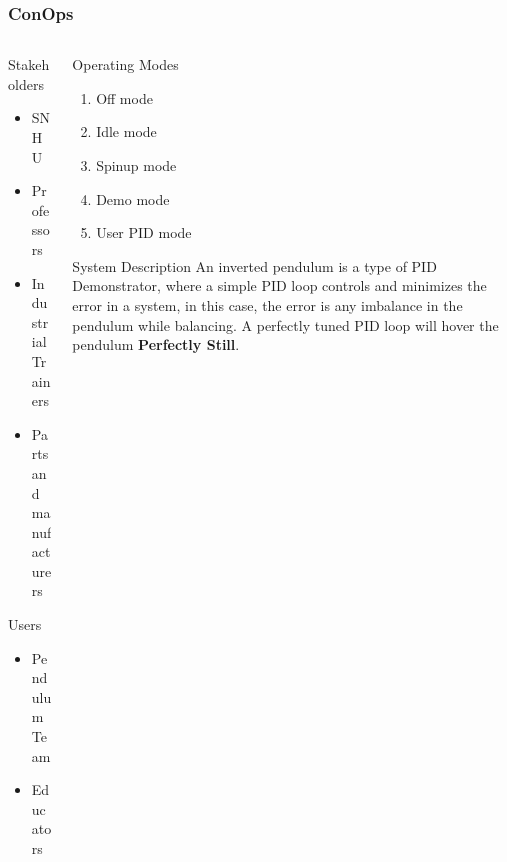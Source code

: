 \documentclass[aspectratio=169]{beamer}
\begin{document}
\begin{frame}
    \frametitle{ConOps}

    \begin{columns}

    \begin{column}{0.34\textwidth}
        Stakeholders
        \begin{itemize}
         \item SNHU
         \item Professors
         \item Industrial Trainers
         \item Parts and manufacturers
        \end{itemize}

        Users
        \begin{itemize}
         \item Pendulum Team
         \item Educators
        \end{itemize}
    \end{column}

    \begin{column}{0.65\textwidth}
        \begin{block}{Operating Modes}
            \begin{enumerate}
            \item Off mode
            \item Idle mode
            \item Spinup mode
            \item Demo mode
            \item User PID mode
            \end{enumerate}
        \end{block}

        \begin{block}{System Description}
            An inverted pendulum is a type of PID Demonstrator, where a simple PID loop
            controls and minimizes the error in a system, in this case, the error is any imbalance
            in the pendulum while balancing. A perfectly tuned PID loop will hover the pendulum
            \textbf{Perfectly Still}.
        \end{block}
    \end{column}
\end{columns}
\end{frame}
\end{document}
